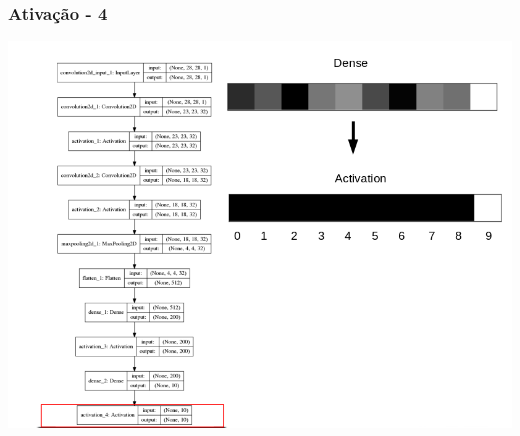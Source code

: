 \documentclass[tikz,11pt]{beamer}
\begin{document}
\begin{frame}
	\frametitle{Ativação - 4}
	\centering
	\includegraphics[height=.8\paperheight]{images/fabio/ativ_4}
\end{frame}
\end{document}
